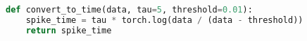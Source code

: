 \begin{lstlisting}[language=Python, caption="Code for RC model"]
def convert_to_time(data, tau=5, threshold=0.01):
	spike_time = tau * torch.log(data / (data - threshold))
	return spike_time
\end{lstlisting}
